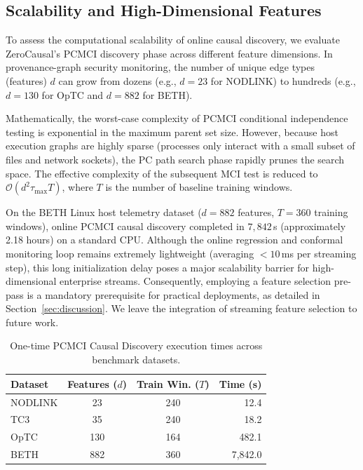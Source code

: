 \subsection{Scalability and High-Dimensional Features}
To assess the computational scalability of online causal discovery, we evaluate ZeroCausal's PCMCI discovery phase across different feature dimensions. In provenance-graph security monitoring, the number of unique edge types (features) $d$ can grow from dozens (e.g., $d=23$ for NODLINK) to hundreds (e.g., $d=130$ for OpTC and $d=882$ for BETH). 

Mathematically, the worst-case complexity of PCMCI conditional independence testing is exponential in the maximum parent set size. However, because host execution graphs are highly sparse (processes only interact with a small subset of files and network sockets), the PC path search phase rapidly prunes the search space. The effective complexity of the subsequent MCI test is reduced to $\mathcal{O}(d^2 \tau_{\max} T)$, where $T$ is the number of baseline training windows. 

On the BETH Linux host telemetry dataset ($d = 882$ features, $T = 360$ training windows), online PCMCI causal discovery completed in $7,842$\,s (approximately 2.18 hours) on a standard CPU. Although the online regression and conformal monitoring loop remains extremely lightweight (averaging $<10$\,ms per streaming step), this long initialization delay poses a major scalability barrier for high-dimensional enterprise streams. Consequently, employing a feature selection pre-pass is a mandatory prerequisite for practical deployments, as detailed in Section~\ref{sec:discussion}. We leave the integration of streaming feature selection to future work.

\begin{table}[htbp]
\centering
\caption{One-time PCMCI Causal Discovery execution times across benchmark datasets.}
\begin{tabular}{lccr}
\toprule
Dataset & Features ($d$) & Train Win. ($T$) & Time (s) \\
\midrule
NODLINK & 23 & 240 & 12.4 \\
TC3 & 35 & 240 & 18.2 \\
OpTC & 130 & 164 & 482.1 \\
BETH & 882 & 360 & 7{,}842.0 \\
\bottomrule
\end{tabular}
\label{tab:scalability}
\end{table}
